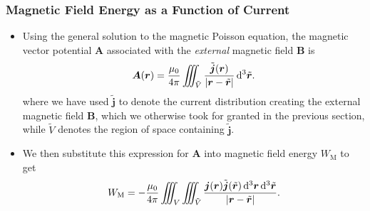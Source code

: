 \documentclass[11pt, a4paper]{article}
\newcommand{\diff}{\mathop{}\!\mathrm{d}} %
\newcommand{\dr}{\diff^{3} \r}  %
\newcommand{\dtr}{\diff^{3} \tilde{\r}}  %
\renewcommand{\vec}[1]{\bm{#1}} %
\renewcommand{\t}[1]{\tilde{#1}} %
\renewcommand{\r}{\vec{r}}
\newcommand{\B}{\vec{B}} %
\newcommand{\A}{\vec{A}} %
\newcommand{\mm}{\mu_{0}}  %
\renewcommand{\j}{\vec{j}}  %
\begin{document}
\subsubsection{Magnetic Field Energy as a Function of Current}
\begin{itemize}
	\item Using the general solution to the magnetic Poisson equation, the magnetic vector potential $ \A $ associated with the \textit{external} magnetic field $ \B $ is
	\begin{equation*}
		\A(\r) = \frac{\mm}{4\pi}\iiint_{\tilde{V}}\frac{\t{\j}(\r)}{\abs{\r - \t{\r}}} \dtr.
	\end{equation*}
    where we have used $ \tilde{\j} $ to denote the current distribution creating the external magnetic field $ \B $, which we otherwise took for granted in the previous section, while $ \tilde{V} $ denotes the region of space containing $ \tilde{\j} $.

    \item We then substitute this expression for $ \A $ into magnetic field energy $ W_{\text{M}} $ to get
	\begin{equation*}
		W_{\text{M}} = - \frac{\mm}{4\pi} \iiint_{V} \iiint_{\t{V}} \frac{\j(\r) \t{\j}(\t{\r}) \dr \dtr}{\abs{\r - \t{\r}}}.
	\end{equation*}
\end{itemize}
\end{document}
